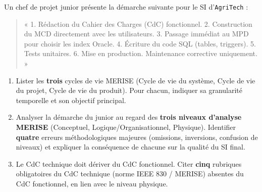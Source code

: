 \documentclass[11pt]{article}
\begin{document}
\begin{exercice}
Un chef de projet junior présente la démarche suivante pour le SI d'\texttt{AgriTech} : 
\begin{quote}
« 1. Rédaction du Cahier des Charges (CdC) fonctionnel. 2. Construction du MCD directement avec les utilisateurs. 3. Passage immédiat au MPD pour choisir les index Oracle. 4. Écriture du code SQL (tables, triggers). 5. Tests unitaires. 6. Mise en production. Maintenance corrective uniquement. »
\end{quote}
\begin{enumerate}
    \item Lister les \textbf{trois} cycles de vie MERISE (Cycle de vie du système, Cycle de vie du projet, Cycle de vie du produit). Pour chacun, indiquer sa granularité temporelle et son objectif principal.
    \item Analyser la démarche du junior au regard des \textbf{trois niveaux d'analyse MERISE} (Conceptuel, Logique/Organisationnel, Physique). Identifier \textbf{quatre} erreurs méthodologiques majeures (omissions, inversions, confusion de niveaux) et expliquer la conséquence de chacune sur la qualité du SI final.
    \item Le CdC technique doit dériver du CdC fonctionnel. Citer \textbf{cinq} rubriques obligatoires du CdC technique (norme IEEE 830 / MERISE) absentes du CdC fonctionnel, en lien avec le niveau physique.
\end{enumerate}
\end{exercice}
\end{document}
